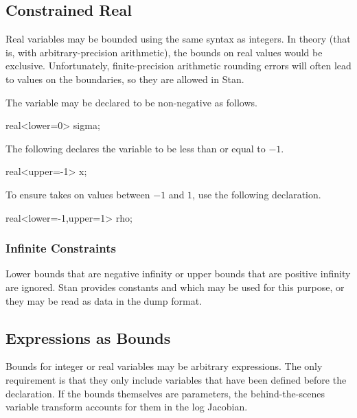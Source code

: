 \subsection{Constrained Real}

Real variables may be bounded using the same syntax as integers.  In
theory (that is, with arbitrary-precision arithmetic), the bounds on
real values would be exclusive.  Unfortunately, finite-precision
arithmetic rounding errors will often lead to values on the
boundaries, so they are allowed in Stan.

The variable  may be declared to be non-negative as follows.
%
\begin{stancode}
real<lower=0> sigma;
\end{stancode}
%
The following declares the variable  to be less than or equal
to $-1$.
%
\begin{stancode}
real<upper=-1> x;
\end{stancode}
%
To ensure  takes on values between $-1$ and $1$, use the
following declaration.
%
\begin{stancode}
real<lower=-1,upper=1> rho;
\end{stancode}
%

\subsubsection{Infinite Constraints}

Lower bounds that are negative infinity or upper bounds that are
positive infinity are ignored.  Stan provides constants
 and  which may
be used for this purpose, or they may be read as data in the dump
format.


\subsection{Expressions as Bounds}

Bounds for integer or real variables may be arbitrary expressions.
The only requirement is that they only include variables that have
been defined before the declaration.  If the bounds themselves are
parameters, the behind-the-scenes variable transform accounts for them
in the log Jacobian.

